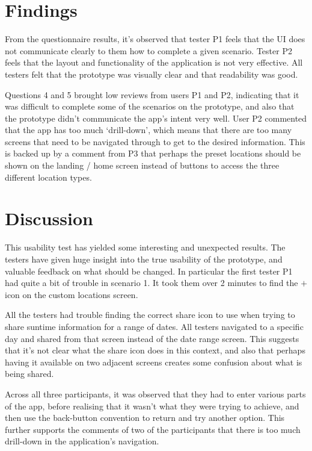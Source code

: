 \documentclass[11pt,english,numbers=endperiod,parskip=half]{scrartcl}
\begin{document}
\section{Findings}
	From the questionnaire results, it's observed that tester P1 feels that the UI
	does not communicate clearly to them how to complete a given scenario. Tester
	P2 feels that the layout and functionality of the application is not
	very effective. All testers felt that the prototype was visually clear and
	that readability was good.

	Questions 4 and 5 brought low reviews from users P1 and P2, indicating that it
	was difficult to complete some of the scenarios on the prototype, and also
	that the prototype didn't communicate the app's intent very well. User P2
	commented that the app has too much `drill-down', which means that there are
	too many screens that need to be navigated through to get to the desired
	information. This is backed up by a comment from P3 that perhaps the preset
	locations should be shown on the landing / home screen instead of buttons to
	access the three different location types.

\section{Discussion}
	This usability test has yielded some interesting and unexpected results. The
	testers have given huge insight into the true usability of the prototype, and
	valuable feedback on what should be changed. In particular the first tester P1
	had quite a bit of trouble in scenario 1. It took them over 2 minutes to find
	the $+$ icon on the custom locations screen.

	All the testers had trouble finding the correct share icon to use
	when trying to share suntime information for a range of dates. All testers
	navigated to a specific day and shared from that screen instead of the date
	range screen. This suggests that it's not clear what the share icon does in
	this context, and also that perhaps	having it available on two adjacent
	screens creates some confusion about what is being shared.

	Across all three participants, it was observed that they had to enter various
	parts of the app, before realising that it wasn't what they were trying to
	achieve, and then use the back-button convention to return and try another
	option. This further supports the comments of two of the participants that
	there is too much drill-down in the application's navigation.
\end{document}

